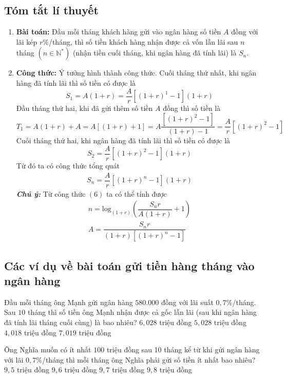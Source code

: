 \subsection{Tóm tắt lí thuyết}
\begin{enumerate}[1)]
	\item \textbf{Bài toán:} Đầu mỗi tháng khách hàng gửi vào ngân hàng số tiền $A$ đồng với lãi kép $r\%$/tháng, thì số tiền khách hàng nhận được cả vốn lẫn lãi sau $n$ tháng $(n\in \mathbb{N}^*)$ (nhận tiền cuối tháng, khi ngân hàng đã tính lãi) là $S_n$.
	\item \textbf{Công thức:} Ý tưởng hình thành công thức. Cuối tháng thứ nhất, khi ngân hàng đã tính lãi thì số tiền có được là $$S_1=A(1+r)=\dfrac{A}{r}\left[(1+r)^1-1\right](1+r)$$
	Đầu tháng thứ hai, khi đã gửi thêm số tiền $A$ đồng thì số tiền là 
	$$T_1=A(1+r)+A=A\left[(1+r)+1\right]=A\dfrac{\left[(1+r)^2-1\right]}{(1+r)-1}=\dfrac{A}{r}\left[(1+r)^2-1\right]$$
	Cuối tháng thứ hai, khi ngân hàng đã tính lãi thì số tiền có được là
	$$S_2=\dfrac{A}{r}\left[(1+r)^2-1\right](1+r)$$
	Từ đó ta có công thức tổng quát
	\begin{eqnarray}
	\boxed{S_n=\dfrac{A}{r}\left[(1+r)^n-1\right](1+r)}
	\end{eqnarray}
	\textit{\textbf{Chú ý:}} Từ công thức $(6)$ ta có thể tính được
	\begin{eqnarray}
	\boxed{n=\mathrm{log}_{(1+r)}\left(\dfrac{S_nr}{A(1+r)}+1\right)}\\
	\boxed{A=\dfrac{S_nr}{(1+r)\left[(1+r)^n-1\right]}}
	\end{eqnarray}
\end{enumerate}	
\subsection{Các ví dụ về bài toán gửi tiền hàng tháng vào ngân hàng}
\begin{vd}%
	Đầu mỗi tháng ông Mạnh gửi ngân hàng $580.000$ đồng với lãi suất $0,7\%$/tháng. Sau $10$ tháng thì số tiền ông Mạnh nhận được cả gốc lẫn lãi (sau khi ngân hàng đã tính lãi tháng cuối cùng) là bao nhiêu?
	\newline
	\choice
	{\True $6,028$ triệu đồng}
	{$5,028$ triệu đồng}
	{$4,018$ triệu đồng}
	{$7,019$ triệu đồng}
\end{vd}

\begin{vd}%
	Ông Nghĩa muốn có ít nhất $100$ triệu đồng sau 10 tháng kể từ khi gửi ngân hàng với lãi $0,7\%$/tháng thì mỗi tháng ông Nghĩa phải gửi số tiền ít nhất bao nhiêu?\newline
	\choice
	{$9,5$ triệu đồng}
	{$9,6$ triệu đồng}
	{\True $9,7$ triệu đồng}
	{$9,8$ triệu đồng}
\end{vd}

